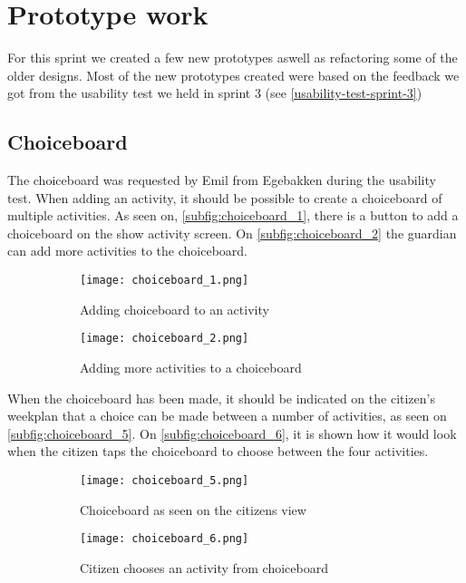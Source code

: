  \section{Prototype work}
For this sprint we created a few new prototypes aswell as refactoring some of the older designs. 
Most of the new prototypes created were based on the feedback we got from the usability test we held in sprint 3 (see \autoref{usability-test-sprint-3})

\subsection{Choiceboard}
The choiceboard was requested by Emil from Egebakken during the usability test. 
When adding an activity, it should be possible to create a choiceboard of multiple activities. 
As seen on, \autoref{subfig:choiceboard_1}, there is a button to add a choiceboard on the show activity screen. 
On \autoref{subfig:choiceboard_2} the guardian can add more activities to the choiceboard.
\begin{figure}[H]
    \begin{subfigure}{0.5\textwidth}
    \texttt{[image: choiceboard\_1.png]}
    \caption{Adding choiceboard to an activity}
    \label{subfig:choiceboard_1}
    \end{subfigure}
    \begin{subfigure}{0.5\textwidth}
    \texttt{[image: choiceboard\_2.png]}
    \caption{Adding more activities to a choiceboard}
    \label{subfig:choiceboard_2}
    \end{subfigure} 
    \caption{}
    \label{fig:choiceboard_1}
\end{figure}
\noindent
When the choiceboard has been made, it should be indicated on the citizen's weekplan that a choice can be made between a number of activities, as seen on \autoref{subfig:choiceboard_5}.
On \autoref{subfig:choiceboard_6}, it is shown how it would look when the citizen taps the choiceboard to choose between the four activities.
\begin{figure}[H]
    \begin{subfigure}{0.5\textwidth}
    \texttt{[image: choiceboard\_5.png]}
    \caption{Choiceboard as seen on the citizens view}
    \label{subfig:choiceboard_5}
    \end{subfigure}
    \begin{subfigure}{0.5\textwidth}
        \texttt{[image: choiceboard\_6.png]}
    \caption{Citizen chooses an activity from choiceboard}
    \label{subfig:choiceboard_6}
    \end{subfigure} 
    \caption{}
    \label{fig:choiceboard_2}
\end{figure}

